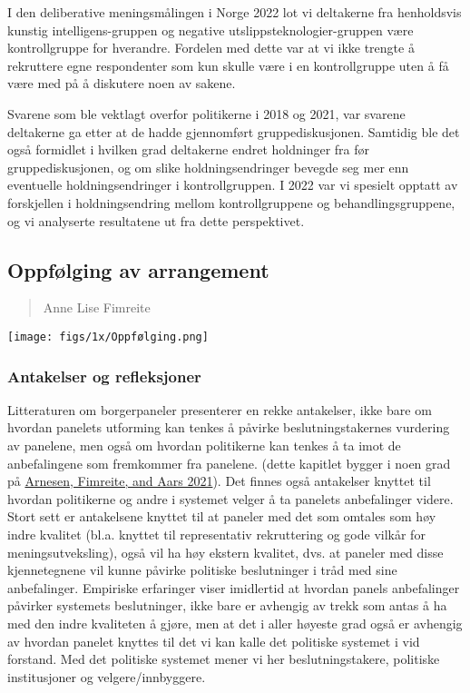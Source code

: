 \documentclass[
  12pt,
  a4paper, 12pt]{article}
\begin{document}
I den deliberative meningsmålingen i Norge 2022 lot vi deltakerne fra henholdsvis kunstig intelligens-gruppen og negative utslippsteknologier-gruppen være kontrollgruppe for hverandre. Fordelen med dette var at vi ikke trengte å rekruttere egne respondenter som kun skulle være i en kontrollgruppe uten å få være med på å diskutere noen av sakene.

Svarene som ble vektlagt overfor politikerne i 2018 og 2021, var svarene deltakerne ga etter at de hadde gjennomført gruppediskusjonen. Samtidig ble det også formidlet i hvilken grad deltakerne endret holdninger fra før gruppediskusjonen, og om slike holdningsendringer bevegde seg mer enn eventuelle holdningsendringer i kontrollgruppen. I 2022 var vi spesielt opptatt av forskjellen i holdningsendring mellom kontrollgruppene og behandlingsgruppene, og vi analyserte resultatene ut fra dette perspektivet.
 

\newpage

\hypertarget{oppfuxf8lging-av-arrangement}{%
\subsection{Oppfølging av arrangement}\label{oppfuxf8lging-av-arrangement}}

\begin{quote}
Anne Lise Fimreite
\end{quote}

\texttt{[image: figs/1x/Oppfølging.png]}

\hypertarget{antakelser-og-refleksjoner}{%
\subsubsection{Antakelser og refleksjoner}\label{antakelser-og-refleksjoner}}

Litteraturen om borgerpaneler presenterer en rekke antakelser, ikke bare om hvordan panelets utforming kan tenkes å påvirke beslutningstakernes vurdering av panelene, men også om hvordan politikerne kan tenkes å ta imot de anbefalingene som fremkommer fra panelene. (dette kapitlet bygger i noen grad på \protect\hyperlink{ref-arnesenloddet}{Arnesen, Fimreite, and Aars 2021}). Det finnes også antakelser knyttet til hvordan politikerne og andre i systemet velger å ta panelets anbefalinger videre. Stort sett er antakelsene knyttet til at paneler med det som omtales som høy indre kvalitet (bl.a. knyttet til representativ rekruttering og gode vilkår for meningsutveksling), også vil ha høy ekstern kvalitet, dvs. at paneler med disse kjennetegnene vil kunne påvirke politiske beslutninger i tråd med sine anbefalinger. Empiriske erfaringer viser imidlertid at hvordan panels anbefalinger påvirker systemets beslutninger, ikke bare er avhengig av trekk som antas å ha med den indre kvaliteten å gjøre, men at det i aller høyeste grad også er avhengig av hvordan panelet knyttes til det vi kan kalle det politiske systemet i vid forstand. Med det politiske systemet mener vi her beslutningstakere, politiske institusjoner og velgere/innbyggere.
\end{document}
